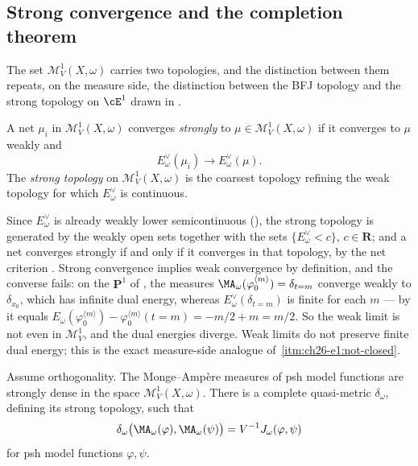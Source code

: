 \subsection{Strong convergence and the completion theorem}
\label{sec:ch28-completion}

The set $\mathcal M^1_V(X,\omega)$ carries two topologies, and the
distinction between them repeats, on the measure side, the distinction
between the BFJ topology and the strong topology on $\cE^1$ drawn in
.

\begin{definition}
\label{def:ch28-strong-measure-convergence}
A net $\mu_i$ in $\mathcal M^1_V(X,\omega)$ converges
\emph{strongly} to $\mu\in\mathcal M^1_V(X,\omega)$ if it converges to
$\mu$ weakly and
\begin{equation}
\label{eq:ch28-strong-measure-convergence}
                  E_\omega^\vee(\mu_i)\longrightarrow
                  E_\omega^\vee(\mu).
\end{equation}
The \emph{strong topology} on $\mathcal M^1_V(X,\omega)$ is the coarsest
topology refining the weak topology for which $E^\vee_\omega$ is
continuous.
\end{definition}

Since $E^\vee_\omega$ is already weakly lower semicontinuous
(), the strong topology is generated by
the weakly open sets together with the sets
$\{E^\vee_\omega<c\}$, $c\in\mathbf R$; and a net converges strongly if
and only if it converges in that topology, by the net criterion
.  Strong convergence implies weak convergence by
definition, and the converse fails: on the $\mathbf P^1$ of
, the measures
$\MA_\omega(\varphi_0^{\langle m\rangle})=\delta_{t=m}$ converge weakly to
$\delta_{x_0}$, which has infinite dual energy, whereas
$E^\vee_\omega(\delta_{t=m})$ is finite for each $m$ --- by
 it equals
$E_\omega(\varphi_0^{\langle m\rangle})
-\varphi_0^{\langle m\rangle}(t=m)=-m/2+m=m/2$.  So the weak limit is not
even in $\mathcal M^1_V$, and the dual energies diverge.  Weak limits do
not preserve finite dual energy; this is the exact measure-side analogue of
\,\cref{itm:ch26-e1:not-closed}.

\begin{theorem}
\label{thm:finite-energy-measure-completion}
Assume orthogonality.  The Monge--Amp\`ere measures of psh model functions
are strongly dense in the space $\mathcal M^1_V(X,\omega)$.  There is a
complete quasi-metric $\delta_\omega$, defining its strong topology, such
that
\begin{equation}
\label{eq:measure-dirichlet-quasimetric}
 \delta_\omega\bigl(\MA_\omega(\varphi),\MA_\omega(\psi)\bigr)
       =V^{-1}J_\omega(\varphi,\psi)
\end{equation}
for psh model functions $\varphi,\psi$.
\end{theorem}

